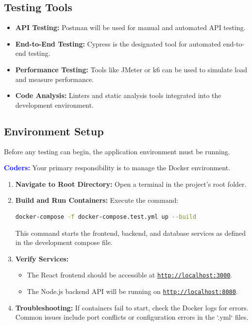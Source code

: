 \documentclass{article}
\newcommand{\role}[1]{\textbf{\textcolor{blue}{#1:}}}
\begin{document}
\subsection{Testing Tools}
\begin{itemize}
    \item \textbf{API Testing:} Postman will be used for manual and automated API testing.
    \item \textbf{End-to-End Testing:} Cypress is the designated tool for automated end-to-end testing.
    \item \textbf{Performance Testing:} Tools like JMeter or k6 can be used to simulate load and measure performance.
    \item \textbf{Code Analysis:} Linters and static analysis tools integrated into the development environment.
\end{itemize}


\subsection{Environment Setup}
Before any testing can begin, the application environment must be running.

\role{Coders}
Your primary responsibility is to manage the Docker environment.
\begin{enumerate}
    \item \textbf{Navigate to Root Directory:} Open a terminal in the project's root folder.
    \item \textbf{Build and Run Containers:} Execute the command:
    \begin{lstlisting}[language=bash]
docker-compose -f docker-compose.test.yml up --build
    \end{lstlisting}
    This command starts the frontend, backend, and database services as defined in the development compose file.
    \item \textbf{Verify Services:}
    \begin{itemize}
        \item The React frontend should be accessible at \href{http://localhost:3000}{\texttt{http://localhost:3000}}.
        \item The Node.js backend API will be running on \href{http://localhost:8080}{\texttt{http://localhost:8080}}.
    \end{itemize}
    \item \textbf{Troubleshooting:} If containers fail to start, check the Docker logs for errors. Common issues include port conflicts or configuration errors in the `.yml` files.
\end{enumerate}
\end{document}
